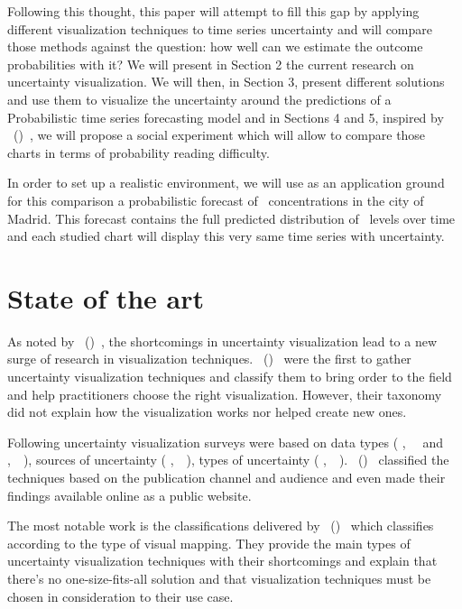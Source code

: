 \documentclass[a4paper,3p,sort&compress]{elsarticle}
\DeclareRobustCommand{\citeext}[1]{\citeauthor{#1},~\citeyear{#1}~\cite{#1}}
\DeclareRobustCommand{\citeextp}[1]{\citeauthor{#1}~(\citeyear{#1})~\cite{#1}}
\begin{document}
Following this thought, this paper will attempt to fill this gap by applying
different visualization techniques to time series uncertainty and will compare
those methods against the question: how well can we estimate the outcome
probabilities with it? We will present in Section 2 the current research on
uncertainty visualization. We will then, in Section 3, present different
solutions and use them to visualize the uncertainty around the predictions of a
Probabilistic time series forecasting model and in Sections 4 and 5, inspired by
\citeextp{brennen_instrument_2018}, we will propose a social
experiment which will allow to compare those charts in terms of probability
reading difficulty.

In order to set up a realistic environment, we will use as an application ground
for this comparison a probabilistic forecast of \no~concentrations in the city
of Madrid. This forecast contains the full predicted distribution of \no~levels
over time and each studied chart will display this very same time series with
uncertainty.

\section{State of the art}
\label{sec:results}

As noted by \citeextp{joslyn_communicating_2010}, the shortcomings in
uncertainty visualization lead to a new surge of research in visualization
techniques. \citeextp{pang_approaches_1997} were the first to gather
uncertainty visualization techniques and classify them to bring order to the
field and help practitioners choose the right visualization. However, their
taxonomy did not explain how the visualization works nor helped create new ones.

Following uncertainty visualization surveys were based on data types (
  \citeext{potter_quantification_2012} and 
  \citeext{brodlie_review_2012}), sources of uncertainty (
  \citeext{bonneau_overview_2014}), types of uncertainty (
\citeext{ristovski_uncertainty_2014}). \citeextp{jena_uncertainty_2020}
classified the techniques based on the publication channel and audience and even
made their findings available online as a public website.

The most notable work is the classifications delivered by 
\citeextp{padilla_uncertainty_2021} which classifies according to the type of visual
mapping. They provide the main types of uncertainty visualization techniques
with their shortcomings and explain that there's no one-size-fits-all solution
and that visualization techniques must be chosen in consideration to their use
case.
\end{document}
